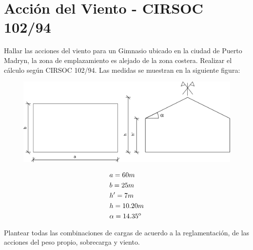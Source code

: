 \section{Acción del Viento - CIRSOC 102/94}
 
Hallar las acciones del viento para un Gimnasio ubicado en la ciudad de Puerto Madryn, la zona de emplazamiento es alejado de la zona costera. Realizar el cálculo según CIRSOC 102/94. Las medidas se muestran en la siguiente figura:\\

\begin{figure}[H]
\begin{center}
     \includegraphics[scale = 0.7]{chapters/chapter_2/images/uno.png}
\end{center}
\end{figure}

\begin{align*}
& a=60m \\
& b=25m \\
& h'=7m \\
& h=10.20m \\
& \alpha=14.35\textsuperscript{o} \\
\end{align*}

Plantear todas las combinaciones de cargas de acuerdo a la reglamentación, de las acciones del peso propio, sobrecarga y viento.

